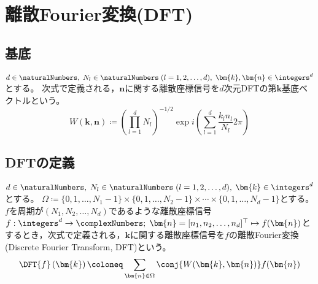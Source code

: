 \chapter{離散Fourier変換(DFT)}
    \newcommand*{\DFTwithArg}[2]{\DFT{#1}\left(#2\right)}
    \section{基底}
        $d\in\naturalNumbers,\;N_l\in\naturalNumbers\;(l=1,2,\dots,d),\;\bm{k},\bm{n}\in\integers^d$とする。
        次式で定義される，$\bm{n}$に関する離散座標信号を$d$次元DFTの第$\bm{k}$基底ベクトルという。
        \[ W(\bm{k},\bm{n}) \coloneq \left(\prod_{l=1}^d N_l\right)^{-1/2} \exp i\left(\sum_{l=1}^d \frac{k_l n_l}{N_l}2\pi\right)\]

    \section{DFTの定義}
        \label{DFTの定義}
        $d\in\naturalNumbers,\;N_l\in\naturalNumbers\;(l=1,2,\dots,d),\;\bm{k}\in\integers^d$とする。
        $\Omega \coloneq \{0,1,\dots,N_1-1\}\times\{0,1,\dots,N_2-1\}\times\cdots\times\{0,1,\dots,N_d-1\}$とする。
        $f$を周期が$(N_1,N_2,\dots,N_d)$であるような離散座標信号$f: \integers^d\to\complexNumbers;\;\bm{n} = [n_1,n_2,\dots,n_d]^\top \mapsto f(\bm{n})$とするとき，次式で定義される，$\bm{k}$に関する離散座標信号を$f$の離散Fourier変換(Discrete Fourier Transform, DFT)という。
        \[ \DFTwithArg{f}{\bm{k}} \coloneq \sum_{\bm{n}\in\Omega} \conj{W(\bm{k},\bm{n})} f(\bm{n}) \]

